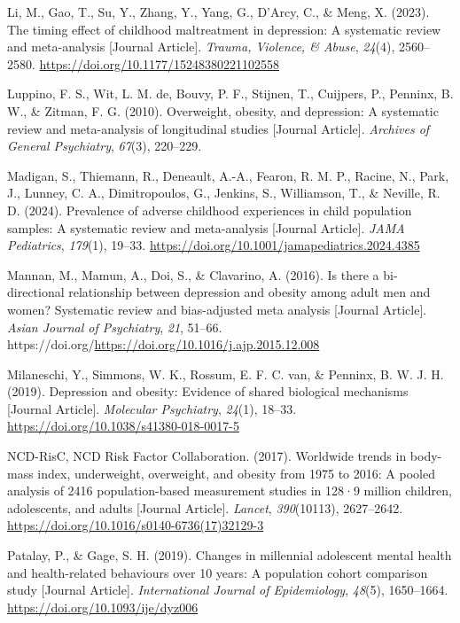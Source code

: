 \documentclass[
  letterpaper,
  DIV=11,
  numbers=noendperiod]{scrreport}
\newlength{\cslhangindent}
\newenvironment{CSLReferences}[2] %
 {\begin{list}{}{%
  \setlength{\itemindent}{0pt}
  \setlength{\leftmargin}{0pt}
  \setlength{\parsep}{0pt}
  \ifodd #1
   \setlength{\leftmargin}{\cslhangindent}
   \setlength{\itemindent}{-1\cslhangindent}
  \fi
  \setlength{\itemsep}{#2\baselineskip}}}
 {\end{list}}
\begin{document}
\begin{CSLReferences}{1}{0}
Li, M., Gao, T., Su, Y., Zhang, Y., Yang, G., D'Arcy, C., \& Meng, X.
(2023). The timing effect of childhood maltreatment in depression: A
systematic review and meta-analysis {[}Journal Article{]}. \emph{Trauma,
Violence, \& Abuse}, \emph{24}(4), 2560--2580.
\url{https://doi.org/10.1177/15248380221102558}

Luppino, F. S., Wit, L. M. de, Bouvy, P. F., Stijnen, T., Cuijpers, P.,
Penninx, B. W., \& Zitman, F. G. (2010). Overweight, obesity, and
depression: A systematic review and meta-analysis of longitudinal
studies {[}Journal Article{]}. \emph{Archives of General Psychiatry},
\emph{67}(3), 220--229.

Madigan, S., Thiemann, R., Deneault, A.-A., Fearon, R. M. P., Racine,
N., Park, J., Lunney, C. A., Dimitropoulos, G., Jenkins, S., Williamson,
T., \& Neville, R. D. (2024). Prevalence of adverse childhood
experiences in child population samples: A systematic review and
meta-analysis {[}Journal Article{]}. \emph{JAMA Pediatrics},
\emph{179}(1), 19--33.
\url{https://doi.org/10.1001/jamapediatrics.2024.4385}

Mannan, M., Mamun, A., Doi, S., \& Clavarino, A. (2016). Is there a
bi-directional relationship between depression and obesity among adult
men and women? Systematic review and bias-adjusted meta analysis
{[}Journal Article{]}. \emph{Asian Journal of Psychiatry}, \emph{21},
51--66. https://doi.org/\url{https://doi.org/10.1016/j.ajp.2015.12.008}

Milaneschi, Y., Simmons, W. K., Rossum, E. F. C. van, \& Penninx, B. W.
J. H. (2019). Depression and obesity: Evidence of shared biological
mechanisms {[}Journal Article{]}. \emph{Molecular Psychiatry},
\emph{24}(1), 18--33. \url{https://doi.org/10.1038/s41380-018-0017-5}

NCD-RisC, NCD Risk Factor Collaboration. (2017). Worldwide trends in
body-mass index, underweight, overweight, and obesity from 1975 to 2016:
A pooled analysis of 2416 population-based measurement studies in 128·9
million children, adolescents, and adults {[}Journal Article{]}.
\emph{Lancet}, \emph{390}(10113), 2627--2642.
\url{https://doi.org/10.1016/s0140-6736(17)32129-3}

Patalay, P., \& Gage, S. H. (2019). Changes in millennial adolescent
mental health and health-related behaviours over 10 years: A population
cohort comparison study {[}Journal Article{]}. \emph{International
Journal of Epidemiology}, \emph{48}(5), 1650--1664.
\url{https://doi.org/10.1093/ije/dyz006}


\end{CSLReferences}
\end{document}
